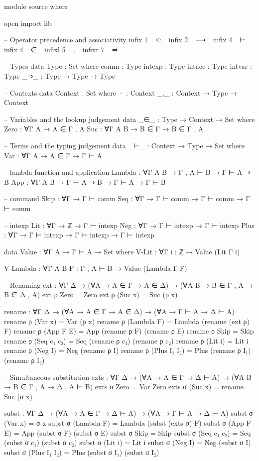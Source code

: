 \documentclass{article}
\begin{document}
\begin{prev}
\begin{code}
module source where

open import lib

-- Operator precedence and associativity
infix 1 _≤:_
infix 2 _⟶_ 
infix 4 _⊢_
infix 4 _∈_
infixl 5 _,_
infixr 7 _⇒_

-- Types
data Type : Set where
    comm : Type
    intexp : Type
    intacc : Type
    intvar : Type
    _⇒_ : Type → Type → Type

-- Contexts
data Context : Set where
    · : Context
    _,_ : Context → Type → Context

-- Variables and the lookup judgement
data _∈_ : Type → Context → Set where
    Zero : ∀{Γ A} → A ∈ Γ , A
    Suc : ∀{Γ A B} → B ∈ Γ → B ∈ Γ , A

-- Terms and the typing judgement
data _⊢_ : Context → Type → Set where
    Var : ∀{Γ A} → A ∈ Γ → Γ ⊢ A

    -- lambda function and application
    Lambda : ∀{Γ A B} → Γ , A ⊢ B → Γ ⊢ A ⇒ B
    App : ∀{Γ A B} → Γ ⊢ A ⇒ B → Γ ⊢ A → Γ ⊢ B

    -- command
    Skip : ∀{Γ} → Γ ⊢ comm
    Seq : ∀{Γ} → Γ ⊢ comm → Γ ⊢ comm → Γ ⊢ comm

    -- intexp
    Lit : ∀{Γ} → ℤ → Γ ⊢ intexp
    Neg : ∀{Γ} → Γ ⊢ intexp → Γ ⊢ intexp
    Plus : ∀{Γ} → Γ ⊢ intexp → Γ ⊢ intexp → Γ ⊢ intexp


data Value : ∀{Γ A} → Γ ⊢ A → Set where
    V-Lit : ∀{Γ} {i : ℤ} → Value (Lit {Γ} i)

    V-Lambda : ∀{Γ A B} {F : Γ , A ⊢ B} → Value (Lambda {Γ} F)

-- Renaming
ext : ∀{Γ Δ} → (∀{A} → A ∈ Γ → A ∈ Δ) → (∀{A B} → B ∈ Γ , A → B ∈ Δ , A)
ext ρ Zero = Zero
ext ρ (Suc x) = Suc (ρ x)

rename : ∀{Γ Δ} → (∀{A} → A ∈ Γ → A ∈ Δ) → (∀{A} → Γ ⊢ A → Δ ⊢ A)
rename ρ (Var x) = Var (ρ x)
rename ρ (Lambda F) = Lambda (rename (ext ρ) F)
rename ρ (App F E) = App (rename ρ F) (rename ρ E)
rename ρ Skip = Skip
rename ρ (Seq c₁ c₂) = Seq (rename ρ c₁) (rename ρ c₂)
rename ρ (Lit i) = Lit i
rename ρ (Neg I) = Neg (rename ρ I)
rename ρ (Plus I₁ I₂) = Plus (rename ρ I₁) (rename ρ I₂)

-- Simultaneous substitution
exts : ∀{Γ Δ} → (∀{A} → A ∈ Γ → Δ ⊢ A) → (∀{A B} → B ∈ Γ , A → Δ , A ⊢ B)
exts σ Zero = Var Zero
exts σ (Suc x) = rename Suc (σ x)

subst : ∀{Γ Δ} → (∀{A} → A ∈ Γ → Δ ⊢ A) → (∀{A} → Γ ⊢ A → Δ ⊢ A)
subst σ (Var x) = σ x
subst σ (Lambda F) = Lambda (subst (exts σ) F)
subst σ (App F E) = App (subst σ F) (subst σ E)
subst σ Skip = Skip
subst σ (Seq c₁ c₂) = Seq (subst σ c₁) (subst σ c₂)
subst σ (Lit i) = Lit i
subst σ (Neg I) = Neg (subst σ I)
subst σ (Plus I₁ I₂) = Plus (subst σ I₁) (subst σ I₂)


\end{code}
\end{prev}
\end{document}
